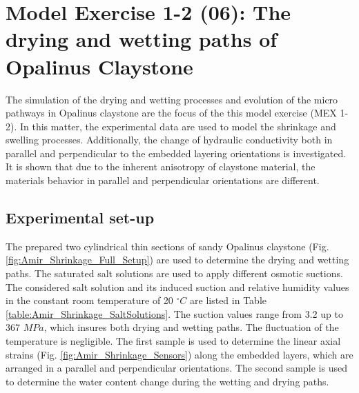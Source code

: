 \section{Model Exercise 1-2 (06): The drying and wetting paths of Opalinus Claystone}
\label{sec:mex06}

The simulation of the drying and wetting processes and evolution of the micro pathways in Opalinus claystone are the focus of the this model exercise (MEX 1-2). In this matter, the experimental data are used to model the shrinkage and swelling processes. Additionally, the change of hydraulic conductivity both in parallel and perpendicular to the embedded layering orientations is investigated. It is shown that due to the inherent anisotropy of claystone material, the materials behavior in parallel and perpendicular orientations are different.  

\subsection{Experimental set-up}
The prepared two cylindrical thin sections of sandy Opalinus claystone (Fig. \ref{fig:Amir_Shrinkage_Full_Setup}) are used to determine the drying and wetting paths. The saturated salt solutions are used to apply different osmotic suctions. The considered salt solution and its induced suction and relative humidity values in the constant room temperature of 20 $^{\circ}C$ are listed in Table \ref{table:Amir_Shrinkage_SaltSolutions}. The suction values range from 3.2 up to 367 $MPa$, which insures both drying and wetting paths. The fluctuation of the temperature is negligible. The first sample is used to determine the linear axial strains (Fig. \ref{fig:Amir_Shrinkage_Sensors}) along the embedded layers, which are arranged in a parallel and perpendicular orientations. The second sample is used to determine the water content change during the wetting and drying paths.

